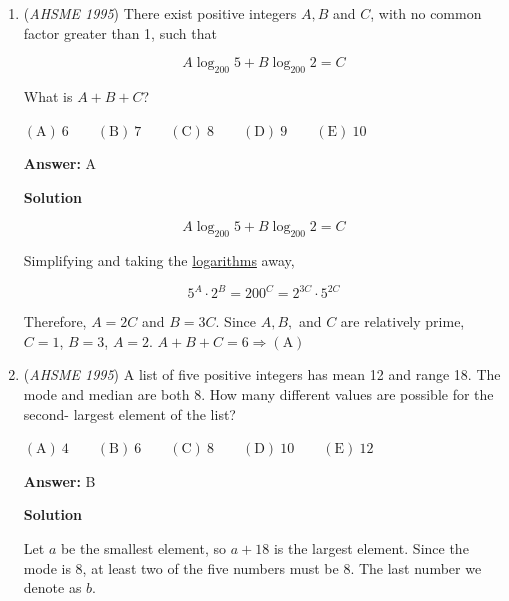 \begin{enumerate}
 By the \href{https://artofproblemsolving.com/wiki/index.php?title=Triangle\_Inequality}{Triangle Inequality} we also have that $k > 4$, so $k$ can be $5, 6, 7, \ldots , 10$, or $6$ values.

 If $k$ is the largest side, 

 
 \[k^2 >11^2 + 15^2 \Longrightarrow k > \sqrt{346}\]

 Combining with the Triangle Inequality $19 \le k < 26$, or $7$ values. These total $13\ \mathrm{(D)}$ values of $k$. 

 


	\item (\textit{AHSME 1995}) There exist positive integers $A,B$ and $C$, with no common factor greater than 1, such that


 
 \[A \log_{200} 5 + B \log_{200} 2 = C\]


 What is $A + B + C$?


 $\mathrm{(A) \ 6 } \qquad \mathrm{(B) \ 7 } \qquad \mathrm{(C) \ 8 } \qquad \mathrm{(D) \ 9 } \qquad \mathrm{(E) \ 10 }$

 \textbf{Answer: }A



\textbf{Solution}


 \[A \log_{200} 5 + B \log_{200} 2 = C\]

 Simplifying and taking the \href{https://artofproblemsolving.com/wiki/index.php?title=Logarithm}{logarithms} away,

 
 \[5^A \cdot 2^B=200^C=2^{3C} \cdot 5^{2C}\]

 Therefore, $A=2C$ and $B=3C$. Since $A, B,$ and $C$ are relatively prime, $C=1$, $B=3$, $A=2$. $A+B+C=6 \Rightarrow \mathrm{(A)}$



	\item (\textit{AHSME 1995}) A list of five positive integers has mean 12 and range 18. The mode and median are both 8. How many different values are possible for the second- largest element of the list? 


 $\mathrm{(A) \ 4 } \qquad \mathrm{(B) \ 6 } \qquad \mathrm{(C) \ 8 } \qquad \mathrm{(D) \ 10 } \qquad \mathrm{(E) \ 12 }$

 \textbf{Answer: }B



\textbf{Solution}

Let $a$ be the smallest element, so $a+18$ is the largest element. Since the mode is $8$, at least two of the five numbers must be $8$. The last number we denote as $b$.


\end{enumerate}
